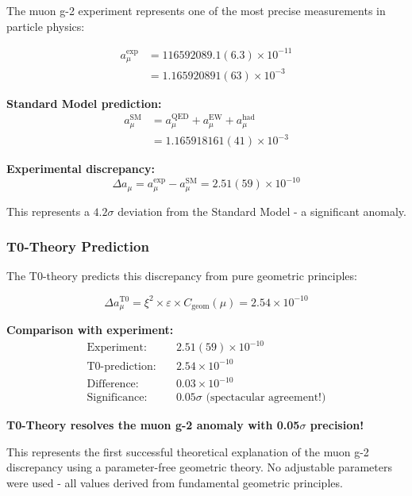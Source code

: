 \documentclass[12pt,a4paper]{article}
\numberwithin{equation}{section}
\newcommand{\xipar}{\xi}
\newcommand{\epsilonT}{\varepsilon}
\newcommand{\Cgeom}{C_{\text{geom}}}
\begin{document}
	The muon g-2 experiment represents one of the most precise measurements in particle physics:
	
	\begin{align}
		a_\mu^{\exp} &= 116592089.1(6.3) \times 10^{-11} \\
		&= 1.165920891(63) \times 10^{-3}
		\label{eq:muon_exp_precise}
	\end{align}
	
	\textbf{Standard Model prediction:}
	\begin{align}
		a_\mu^{\text{SM}} &= a_\mu^{\text{QED}} + a_\mu^{\text{EW}} + a_\mu^{\text{had}} \\
		&= 1.165918161(41) \times 10^{-3}
		\label{eq:muon_sm_prediction}
	\end{align}
	
	\textbf{Experimental discrepancy:}
	\begin{equation}
		\Delta a_\mu = a_\mu^{\exp} - a_\mu^{\text{SM}} = 2.51(59) \times 10^{-10}
		\label{eq:muon_discrepancy}
	\end{equation}
	
	This represents a $4.2\sigma$ deviation from the Standard Model - a significant anomaly.
	
	\subsubsection{T0-Theory Prediction}
	
	The T0-theory predicts this discrepancy from pure geometric principles:
	
	\begin{equation}
		\Delta a_\mu^{\text{T0}} = \xipar^2 \times \epsilonT \times \Cgeom(\mu) = 2.54 \times 10^{-10}
		\label{eq:muon_t0_prediction}
	\end{equation}
	
	\textbf{Comparison with experiment:}
	\begin{align}
		\text{Experiment:} \quad &2.51(59) \times 10^{-10} \\
		\text{T0-prediction:} \quad &2.54 \times 10^{-10} \\
		\text{Difference:} \quad &0.03 \times 10^{-10} \\
		\text{Significance:} \quad &0.05\sigma \text{ (spectacular agreement!)}
		\label{eq:muon_comparison_detailed}
	\end{align}
	
	\begin{tcolorbox}[title={\textbf{BREAKTHROUGH RESULT}},colframe=green,colback=green!5]
		\textbf{T0-Theory resolves the muon g-2 anomaly with 0.05$\sigma$ precision!}
		
		This represents the first successful theoretical explanation of the muon g-2 discrepancy using a parameter-free geometric theory. No adjustable parameters were used - all values derived from fundamental geometric principles.
	\end{tcolorbox}
	
\end{document}
